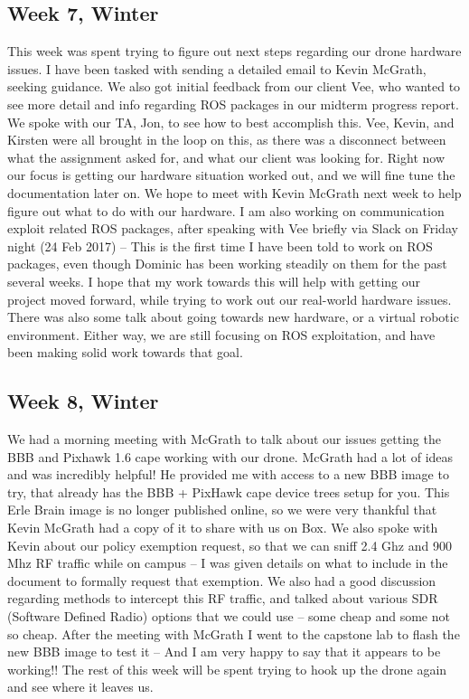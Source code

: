 \subsection{Week 7, Winter}
This week was spent trying to figure out next steps regarding our drone hardware issues. I have been tasked with sending a detailed email to Kevin McGrath, seeking guidance. We also got initial feedback from our client Vee, who wanted to see more detail and info regarding ROS packages in our midterm progress report. We spoke with our TA, Jon, to see how to best accomplish this. Vee, Kevin, and Kirsten were all brought in the loop on this, as there was a disconnect between what the assignment asked for, and what our client was looking for. Right now our focus is getting our hardware situation worked out, and we will fine tune the documentation later on. We hope to meet with Kevin McGrath next week to help figure out what to do with our hardware.                            I am also working on communication exploit related ROS packages, after speaking with Vee briefly via Slack on Friday night (24 Feb 2017) -- This is the first time I have been told to work on ROS packages, even though Dominic has been working steadily on them for the past several weeks. I hope that my work towards this will help with getting our project moved forward, while trying to work out our real-world hardware issues.
There was also some talk about going towards new hardware, or a virtual robotic environment. Either way, we are still focusing on ROS exploitation, and have been making solid work towards that goal.
\subsection{Week 8, Winter}
We had a morning meeting with McGrath to talk about our issues getting the BBB and Pixhawk 1.6 cape working with our drone. McGrath had a lot of ideas and was incredibly helpful! He provided me with access to a new BBB image to try, that already has the BBB + PixHawk cape device trees setup for you. This Erle Brain image is no longer published online, so we were very thankful that Kevin McGrath had a copy of it to share with us on Box. We also spoke with Kevin about our policy exemption request, so that we can sniff 2.4 Ghz and 900 Mhz RF traffic while on campus -- I was given details on what to include in the document to formally request that exemption. We also had a good discussion regarding methods to intercept this RF traffic, and talked about various SDR (Software Defined Radio) options that we could use -- some cheap and some not so cheap.
After the meeting with McGrath I went to the capstone lab to flash the new BBB image to test it -- And I am very happy to say that it appears to be working!! The rest of this week will be spent trying to hook up the drone again and see where it leaves us.
